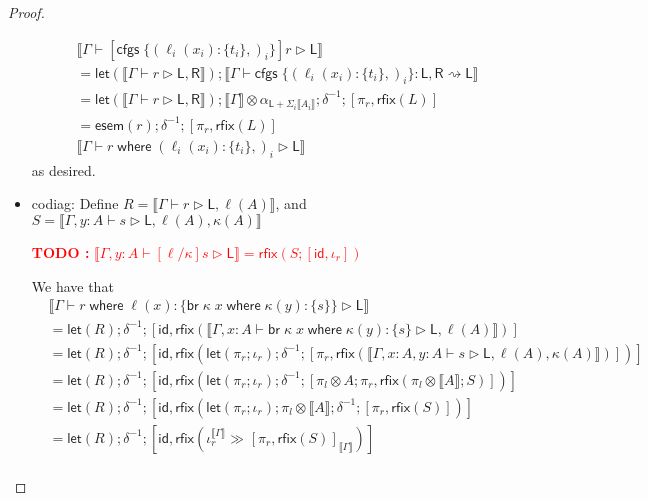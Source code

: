 \documentclass[acmsmall,screen,review]{acmart}
\newcounter{todos}
\newcommand{\TODO}[1]{{
  \stepcounter{todos}
  \begin{center}\large{\textcolor{red}{\textbf{TODO \arabic{todos}:} #1}}\end{center}
}}
\newcommand{\ms}[1]{\ensuremath{\mathsf{#1}}}
\newcommand{\lto}{:}
\newcommand{\brb}[2]{\ms{br}\;#1\;#2}
\newcommand{\where}[2]{#1\;\ms{where}\;#2}
\newcommand{\wbranch}[3]{#1(#2) \lto \{#3\}}
\newcommand{\cfgsubst}[1]{\ms{cfgs}\;\{#1\}}
\newcommand{\bhyp}[2]{#1 : #2}
\newcommand{\haslb}[3]{#1 \vdash #2 \rhd #3}
\newcommand{\lbsubst}[4]{#1 \vdash #2: #3 \rightsquigarrow #4}
\newcommand{\brle}[1]{{\textsf{#1}}}
\newcommand{\dnt}[1]{\llbracket{#1}\rrbracket}
\newcommand{\entrymor}[1]{\ms{esem}(#1)}
\newcommand{\lmor}[1]{\ms{let}(#1)}
\newcommand{\rfix}[1]{\ms{rfix}(#1)}
\newcommand{\rseq}[3]{#2 \gg_{#1} #3}
\newcommand{\envcop}[3]{[#2, #3]_{#1}}
\newcommand{\envinr}[1]{\iota^{#1}_{r}}
\begin{document}
\begin{proof}
\begin{itemize}[leftmargin=*]
\begin{equation}
      \begin{aligned}
        & \dnt{\haslb{\Gamma}{[\cfgsubst{(\wbranch{\ell_i}{x_i}{t_i},)_i}]r}{\ms{L}}}  \\
        & = \lmor{\dnt{\haslb{\Gamma}{r}{\ms{L}, \ms{R}}}}
          ; \dnt{
            \lbsubst{\Gamma}
              {\cfgsubst{(\wbranch{\ell_i}{x_i}{t_i},)_i}}{\ms{L}, \ms{R}}{\ms{L}}
          } \\
        & = \lmor{\dnt{\haslb{\Gamma}{r}{\ms{L}, \ms{R}}}}
          ; \dnt{\Gamma} \otimes \alpha_{\ms{L} + \Sigma_i\dnt{A_i}}; \delta^{-1} 
          ; [\pi_r, \rfix{L}] \\
        & = \entrymor{r}; \delta^{-1} ; [\pi_r, \rfix{L}] \\
        & \dnt{\haslb{\Gamma}{\where{r}{(\wbranch{\ell_i}{x_i}{t_i},)_i}}{\ms{L}}}
      \end{aligned}
    \end{equation}
    as desired.
    \item \brle{codiag}: 
    Define $R = \dnt{\haslb{\Gamma}{r}{\ms{L}, \ell(A)}}$, and %
           $S = \dnt{\haslb{\Gamma, \bhyp{y}{A}}{s}{\ms{L}, \ell(A), \kappa(A)}}$ %
    \TODO{$\dnt{\haslb{\Gamma, \bhyp{y}{A}}{[\ell/\kappa]s}{\ms{L}}} 
      = \rfix{S ; [\ms{id}, \iota_r]}$}
    We have that
    \begin{equation}
      \begin{aligned}
      & \dnt{\haslb{\Gamma}
        {\where{r}{\wbranch{\ell}{x}{\where{\brb{\kappa}{x}}{\wbranch{\kappa}{y}{s}}}}}{\ms{L}}} \\
      & = \lmor{R} ; \delta^{-1} ; [\ms{id}, 
        \rfix{\dnt{\haslb{\Gamma, \bhyp{x}{A}}
          {\where{\brb{\kappa}{x}}{\wbranch{\kappa}{y}{s}}}{\ms{L}, \ell(A)}}}] \\
      & = \lmor{R} ; \delta^{-1} ; [\ms{id}, 
        \rfix{\lmor{\pi_r ; \iota_r} ; \delta^{-1} 
            ; [\pi_r, 
            \rfix{\dnt{\haslb{\Gamma, \bhyp{x}{A}, \bhyp{y}{A}}{s}{\ms{L}, \ell(A), \kappa(A)}}}]
          }] \\
      & = \lmor{R} ; \delta^{-1} ; [\ms{id}, 
        \rfix{\lmor{\pi_r ; \iota_r} ; \delta^{-1} 
            ; [\pi_l \otimes A ; \pi_r, 
            \rfix{\pi_l \otimes \dnt{A} ; S}]
          }] \\
      & = \lmor{R} ; \delta^{-1} ; [\ms{id}, 
        \rfix{\lmor{\pi_r ; \iota_r} ; \pi_l \otimes \dnt{A} ; \delta^{-1} ; [\pi_r, \rfix{S}]
          }] \\
      & = \lmor{R} ; \delta^{-1} ; [\ms{id}, 
          \rfix{\rseq{}{\envinr{\dnt{\Gamma}}}{\envcop{\dnt{\Gamma}}{\pi_r}{\rfix{S}}}}] \\

\end{aligned}
\end{equation}
\end{itemize}
\end{proof}
\end{document}
